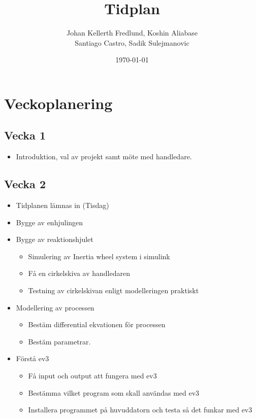\documentclass[a4paper]{article}
\title{Tidplan}
\author{Johan Kellerth Fredlund, Koshin Aliabase\\ Santiago Castro, Sadik Sulejmanovic}
\date{\today}
\begin{document}
\maketitle



\section{Veckoplanering}

	\subsection*{Vecka 1}
    
    \begin{itemize}
    \item Introduktion, val av projekt samt möte med handledare.
	\end{itemize}

	\subsection*{Vecka 2}
	\begin{itemize}
    		\item Tidplanen lämnas in (Tisdag)
    		\item Bygge av enhjulingen
    		\item Bygge av reaktionshjulet
    	
    	\begin{itemize}
    \item Simulering av Inertia wheel system i simulink
    		\item Få en cirkelskiva av handledaren
		\item Testning av cirkelskivan enligt modelleringen praktiskt
    	\end{itemize}
    \item Modellering av processen
    		\begin{itemize}
			\item Bestäm differential ekvationen för processen
    			\item Bestäm parametrar.
		\end{itemize}        
	
	\item Förstå ev3
	\begin{itemize}
		\item Få input och output att fungera med ev3
		\item Bestämma vilket program som skall användas med ev3 
		\item Installera programmet på huvuddatorn och testa så det funkar med ev3
	\end{itemize}
	
	\end{itemize}
	
\end{document}
